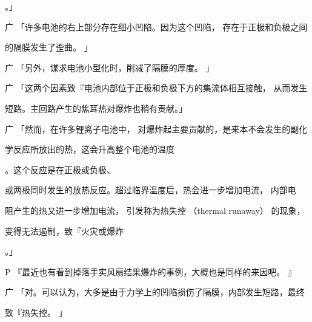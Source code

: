 。」\par
广 「许多电池的右上部分存在细小凹陷。因为这个凹陷， 存在于正极和负极之间\par
的隔膜发生了歪曲。 」\par
广 「另外，谋求电池小型化时，削减了隔膜的厚度。 」\par
广 「这两个因素致『电池内部位于正极和负极下方的集流体相互接触， 从而发生\par
短路。主回路产生的焦耳热对爆炸也稍有贡献。」\par
广 「然而，在许多锂离子电池中， 对爆炸起主要贡献的，是来本不会发生的副化\par
学反应所放出的热，这会升高整个电池的温度\par
[14]\par
。这个反应是在正极或负极、\par
或两极同时发生的放热反应。超过临界温度后，热会进一步增加电流， 内部电\par
阻产生的热又进一步增加电流， 引发称为热失控 （thermal runaway） 的现象，\par
变得无法遏制，致『火灾或爆炸\par
[15]\par
。」\par
P 『最近也有看到掉落手实风扇结果爆炸的事例，大概也是同样的来因吧。 』\par
广 「对。可以认为，大多是由于力学上的凹陷损伤了隔膜，内部发生短路，最终\par
致『热失控。 」\par

